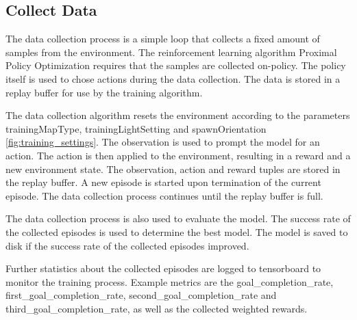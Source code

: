 \subsection{Collect Data}

The data collection process is a simple loop that collects a fixed amount of samples from the environment. The reinforcement learning algorithm Proximal Policy Optimization requires that the samples are collected on-policy. The policy itself is used to chose actions during the data collection. The data is stored in a replay buffer for use by the training algorithm.

The data collection algorithm resets the environment according to the parameters trainingMapType, trainingLightSetting and spawnOrientation \ref{fig:training_settings}. The observation is used to prompt the model for an action. The action is then applied to the environment, resulting in a reward and a new environment state. The observation, action and reward tuples are stored in the replay buffer. A new episode is started upon termination of the current episode. The data collection process continues until the replay buffer is full.

The data collection process is also used to evaluate the model. The success rate of the collected episodes is used to determine the best model. The model is saved to disk if the success rate of the collected episodes improved.

Further statistics about the collected episodes are logged to tensorboard to monitor the training process. Example metrics are the goal\_completion\_rate, first\_goal\_completion\_rate, second\_goal\_completion\_rate and third\_goal\_completion\_rate, as well as the collected weighted rewards.


